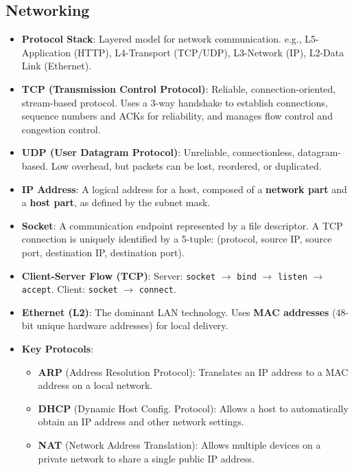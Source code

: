 \documentclass[8pt,a4paper]{article}
\begin{document}
\begin{multicols}{2}
\section*{Networking}
\begin{itemize}
    \item \textbf{Protocol Stack}: Layered model for network communication. e.g., L5-Application (HTTP), L4-Transport (TCP/UDP), L3-Network (IP), L2-Data Link (Ethernet).
    \item \textbf{TCP (Transmission Control Protocol)}: Reliable, connection-oriented, stream-based protocol. Uses a 3-way handshake to establish connections, sequence numbers and ACKs for reliability, and manages flow control and congestion control.
    \item \textbf{UDP (User Datagram Protocol)}: Unreliable, connectionless, datagram-based. Low overhead, but packets can be lost, reordered, or duplicated.
    \item \textbf{IP Address}: A logical address for a host, composed of a \textbf{network part} and a \textbf{host part}, as defined by the subnet mask.
    \item \textbf{Socket}: A communication endpoint represented by a file descriptor. A TCP connection is uniquely identified by a 5-tuple: (protocol, source IP, source port, destination IP, destination port).
    \item \textbf{Client-Server Flow (TCP)}: Server: \texttt{socket} $\to$ \texttt{bind} $\to$ \texttt{listen} $\to$ \texttt{accept}. Client: \texttt{socket} $\to$ \texttt{connect}.
    \item \textbf{Ethernet (L2)}: The dominant LAN technology. Uses \textbf{MAC addresses} (48-bit unique hardware addresses) for local delivery.
    \item \textbf{Key Protocols}:
        \begin{itemize}
            \item \textbf{ARP} (Address Resolution Protocol): Translates an IP address to a MAC address on a local network.
            \item \textbf{DHCP} (Dynamic Host Config. Protocol): Allows a host to automatically obtain an IP address and other network settings.
            \item \textbf{NAT} (Network Address Translation): Allows multiple devices on a private network to share a single public IP address.
        \end{itemize}
\end{itemize}

\end{multicols}
\end{document}

